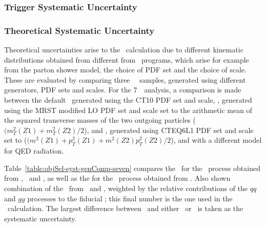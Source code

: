\subsubsection{Trigger Systematic Uncertainty}

\subsubsection{Theoretical Systematic Uncertainty}

Theoretical uncertainties arise to the \CZZ\ calculation due to different
kinematic distributions obtained from different from \mc\ programs, which arise
for example from the parton shower model, the choice of PDF set and the choice
of scale. These are evaluated by comparing three \qqZZ\ \mc\ samples, generated
using different generators, PDF sets and scales. For the 7~\tev\ analysis, a
comparison is made between the default \powhegbox\ generated using the CT10 PDF
set and scale, \pythia, generated using the MRST modified LO PDF set and scale
set to the arithmetic mean of the squared transverse masses of the two outgoing
particles ($(m^{2}_{T}(Z1)+m^{2}_{T}(Z2)/2$), and
\sherpa, generated using CTEQ6L1 PDF set and scale set to
($(m^{2}_{}(Z1)+p^{2}_{T}(Z1)+m^{2}_{}(Z2)p^{2}_{T}(Z2)/2$), and with a different
model for QED radiation.

Table~\ref{table:objSel-syst-genComp-seven} compares the \CZZ\ for the \qqZZ\
process obtained from \powhegbox, \sherpa\ and \pythia, as well as the for the
\CZZ\ process obtained from \ggtwoZZ. Also shown combination of
the \CZZ\ from \powhegbox\ and \ggtwoZZ, weighted by the relative contributions
of the $qq$ and $gg$ processes to the fiducial \cx; this final number is the one
used in the \cx\ calculation. The largest difference between \powhegbox\ and
either \pythia\ or \sherpa\ is taken as the systematic uncertainty.

